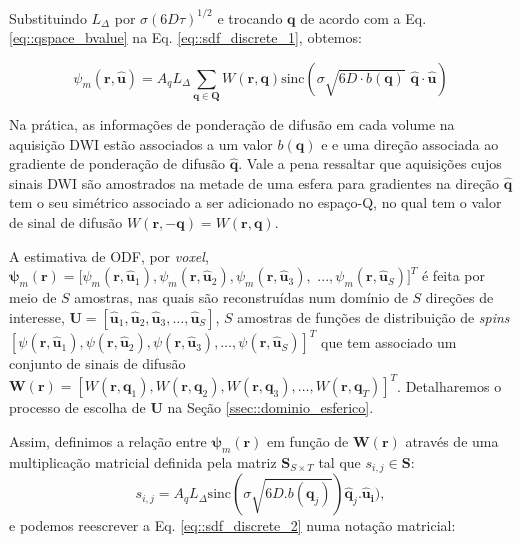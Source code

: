 \documentclass[
    12pt,                %
    oneside,            %
    a4paper,            %
    english,            %
    french,                %
    spanish,            %
    brazil                %
    ]{abntex2}
\begin{document}
Substituindo $L_{\Delta}$ por $\sigma(6D\tau)^{1/2}$ e trocando $\mathbf{q}$ de acordo com a Eq. \ref{eq::qspace_bvalue} na Eq. \ref{eq::sdf_discrete_1}, obtemos:



\begin{equation}
\label{eq::sdf_discrete_2}
    \psi_m(\mathbf{r}, \mathbf{\hat{u}}) =
    A_qL_{\Delta}\sum_{\mathbf{q} \in \mathbf{Q}}W(\mathbf{r}, \mathbf{q})\text{sinc}(\sigma \sqrt{6D\cdot b(\mathbf{q})}\,\,  \mathbf{\hat{q}}\cdot\mathbf{\hat{u}})
\end{equation}

 Na prática, as informações de ponderação de difusão em cada volume na aquisição DWI estão associados a um valor $b(\mathbf{q})$ e  e uma direção associada ao gradiente de ponderação de difusão $\mathbf{\hat{q}}$. Vale a pena ressaltar que aquisições cujos sinais DWI são amostrados na metade de uma esfera para gradientes na direção $\mathbf{\hat{q}}$ tem o seu simétrico associado a ser adicionado no espaço-Q, no qual tem o valor de sinal de difusão $W(\mathbf{r}, -\mathbf{q}) = W(\mathbf{r}, \mathbf{q})$.

A estimativa de ODF, por \textit{voxel}, 
$\boldsymbol{\psi}_m(\mathbf{r}) = [
\psi_m(\mathbf{r}, \mathbf{\hat{u}}_1), 
\psi_m(\mathbf{r}, \mathbf{\hat{u}}_2), 
\psi_m(\mathbf{r}, \mathbf{\hat{u}}_3),$
$ ..., 
\psi_m(\mathbf{r}, \mathbf{\hat{u}}_S)
]^T$
é feita por meio de $S$ amostras, nas quais são reconstruídas num domínio de $S$ direções de interesse, $\mathbf{U} = [
\mathbf{\hat{u}}_1, 
\mathbf{\hat{u}}_2, 
\mathbf{\hat{u}}_3, \dots, 
\mathbf{\hat{u}}_S 
]$, $S$ amostras de funções de distribuição de \textit{spins} $[
\psi(\mathbf{r}, \mathbf{\hat{u}}_1), 
\psi(\mathbf{r}, \mathbf{\hat{u}}_2), 
\psi(\mathbf{r}, \mathbf{\hat{u}}_3), \dots, 
\psi(\mathbf{r}, \mathbf{\hat{u}}_S)
]^T$ que tem associado um conjunto de sinais de difusão $\mathbf{W}(\mathbf{r}) = [
W(\mathbf{r},\mathbf{q}_1),
W(\mathbf{r},\mathbf{q}_2),
W(\mathbf{r},\mathbf{q}_3), \dots ,
W(\mathbf{r},\mathbf{q}_T)
]^T$. Detalharemos o processo de escolha de $\mathbf{U}$ na Seção \ref{ssec::dominio_esferico}.

Assim, definimos a relação entre $\boldsymbol{\psi}_m(\mathbf{r})$ em função de $\mathbf{W}(\mathbf{r})$ através de uma multiplicação matricial definida pela matriz $\mathbf{S}_{S\times T}$ tal que $s_{i,j} \in \mathbf{S}$:
\begin{equation}
\label{eq::s_ij}
s_{i,j} = A_qL_{\Delta}\text{sinc}(\sigma \sqrt{6D.b(\mathbf{q}_j)} )\mathbf{\hat{q}}_j.\mathbf{\hat{u}_i}) ,
\end{equation}
e podemos reescrever a Eq. \ref{eq::sdf_discrete_2} numa notação matricial:
\end{document}
